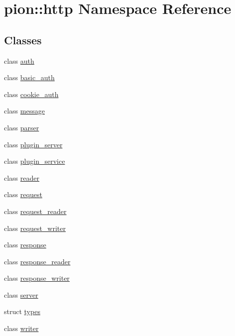 \hypertarget{namespacepion_1_1http}{\section{pion\-:\-:http Namespace Reference}
\label{namespacepion_1_1http}
}
\subsection*{Classes}
\begin{DoxyCompactItemize}
\item 
class \hyperlink{classpion_1_1http_1_1auth}{auth}
\item 
class \hyperlink{classpion_1_1http_1_1basic__auth}{basic\-\_\-auth}
\item 
class \hyperlink{classpion_1_1http_1_1cookie__auth}{cookie\-\_\-auth}
\item 
class \hyperlink{classpion_1_1http_1_1message}{message}
\item 
class \hyperlink{classpion_1_1http_1_1parser}{parser}
\item 
class \hyperlink{classpion_1_1http_1_1plugin__server}{plugin\-\_\-server}
\item 
class \hyperlink{classpion_1_1http_1_1plugin__service}{plugin\-\_\-service}
\item 
class \hyperlink{classpion_1_1http_1_1reader}{reader}
\item 
class \hyperlink{classpion_1_1http_1_1request}{request}
\item 
class \hyperlink{classpion_1_1http_1_1request__reader}{request\-\_\-reader}
\item 
class \hyperlink{classpion_1_1http_1_1request__writer}{request\-\_\-writer}
\item 
class \hyperlink{classpion_1_1http_1_1response}{response}
\item 
class \hyperlink{classpion_1_1http_1_1response__reader}{response\-\_\-reader}
\item 
class \hyperlink{classpion_1_1http_1_1response__writer}{response\-\_\-writer}
\item 
class \hyperlink{classpion_1_1http_1_1server}{server}
\item 
struct \hyperlink{structpion_1_1http_1_1types}{types}
\item 
class \hyperlink{classpion_1_1http_1_1writer}{writer}
\end{DoxyCompactItemize}
